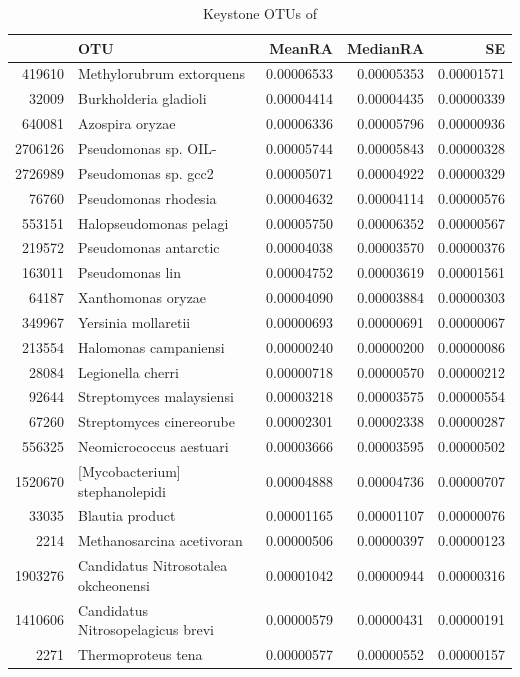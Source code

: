 \documentclass{article}
\begin{document}
\begin{table}[ht]
\centering
\begin{tabular}{rlrrr}
  \hline
 & OTU & MeanRA & MedianRA & SE \\ 
  \hline
419610 & Methylorubrum extorquens & 0.00006533 & 0.00005353 & 0.00001571 \\ 
  32009 & Burkholderia gladioli & 0.00004414 & 0.00004435 & 0.00000339 \\ 
  640081 & Azospira oryzae & 0.00006336 & 0.00005796 & 0.00000936 \\ 
  2706126 & Pseudomonas sp. OIL- & 0.00005744 & 0.00005843 & 0.00000328 \\ 
  2726989 & Pseudomonas sp. gcc2 & 0.00005071 & 0.00004922 & 0.00000329 \\ 
  76760 & Pseudomonas rhodesia & 0.00004632 & 0.00004114 & 0.00000576 \\ 
  553151 & Halopseudomonas pelagi & 0.00005750 & 0.00006352 & 0.00000567 \\ 
  219572 & Pseudomonas antarctic & 0.00004038 & 0.00003570 & 0.00000376 \\ 
  163011 & Pseudomonas lin & 0.00004752 & 0.00003619 & 0.00001561 \\ 
  64187 & Xanthomonas oryzae & 0.00004090 & 0.00003884 & 0.00000303 \\ 
  349967 & Yersinia mollaretii & 0.00000693 & 0.00000691 & 0.00000067 \\ 
  213554 & Halomonas campaniensi & 0.00000240 & 0.00000200 & 0.00000086 \\ 
  28084 & Legionella cherri & 0.00000718 & 0.00000570 & 0.00000212 \\ 
  92644 & Streptomyces malaysiensi & 0.00003218 & 0.00003575 & 0.00000554 \\ 
  67260 & Streptomyces cinereorube & 0.00002301 & 0.00002338 & 0.00000287 \\ 
  556325 & Neomicrococcus aestuari & 0.00003666 & 0.00003595 & 0.00000502 \\ 
  1520670 & [Mycobacterium] stephanolepidi & 0.00004888 & 0.00004736 & 0.00000707 \\ 
  33035 & Blautia product & 0.00001165 & 0.00001107 & 0.00000076 \\ 
  2214 & Methanosarcina acetivoran & 0.00000506 & 0.00000397 & 0.00000123 \\ 
  1903276 & Candidatus Nitrosotalea okcheonensi & 0.00001042 & 0.00000944 & 0.00000316 \\ 
  1410606 & Candidatus Nitrosopelagicus brevi & 0.00000579 & 0.00000431 & 0.00000191 \\ 
  2271 & Thermoproteus tena & 0.00000577 & 0.00000552 & 0.00000157 \\ 
   \hline
\end{tabular}
\caption{Keystone OTUs of } 
\end{table}
\end{document}
